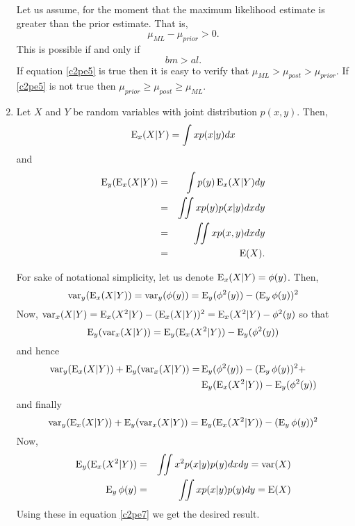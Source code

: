 \begin{enumerate}
Let us assume, for the moment that the maximum likelihood estimate is greater than the prior estimate.
That is,
\[
\mu_{ML} - \mu_{prior} > 0.
\]
This is possible if and only if 
\begin{equation}\label{c2pe5}
bm > al.
\end{equation}
If equation \eqref{c2pe5} is true then it is easy to verify that $\mu_{ML} > \mu_{post} > \mu_{prior}$. 
If \eqref{c2pe5} is not true then $\mu_{prior} \ge \mu_{post} \ge \mu_{ML}$.

\item Let $X$ and $Y$ be random variables with joint distribution $p(x, y)$. Then,
\[
\operatorname{E}_x(X|Y) = \int xp(x|y)dx
\]
and 
\begin{eqnarray*}
\operatorname{E}_y(\operatorname{E}_x(X|Y)) &=& \int p(y)\operatorname{E}_x(X|Y)dy \\
 &=& \iint xp(y)p(x|y)dxdy \\
 &=& \iint xp(x, y)dxdy \\
 &=& \operatorname{E}(X).
\end{eqnarray*}

For sake of notational simplicity, let us denote $\operatorname{E}_x(X|Y) = \phi(y)$. Then, 
\begin{equation}\label{c2pe6}
\operatorname{var}_y(\operatorname{E}_x(X|Y)) = \operatorname{var}_y(\phi(y)) = \operatorname{E}_y(\phi^2(y)) - (\operatorname{E}_y\phi(y))^2
\end{equation}
Now, $\operatorname{var}_x(X|Y) = \operatorname{E}_x(X^2|Y) - (\operatorname{E}_x(X|Y))^2 = \operatorname{E}_x(X^2|Y) - \phi^2(y)$ so that 
\[
\operatorname{E}_y(\operatorname{var}_x(X|Y)) = \operatorname{E}_y(\operatorname{E}_x(X^2|Y)) - \operatorname{E}_y(\phi^2(y))
\]
and hence
\[
\begin{split}
\operatorname{var}_y(\operatorname{E}_x(X|Y)) + \operatorname{E}_y(\operatorname{var}_x(X|Y)) =& \operatorname{E}_y(\phi^2(y)) - (\operatorname{E}_y\phi(y))^2 + \\
 & \operatorname{E}_y(\operatorname{E}_x(X^2|Y)) - \operatorname{E}_y(\phi^2(y)) 
\end{split}
\]
and finally
\begin{equation}\label{c2pe7}
\operatorname{var}_y(\operatorname{E}_x(X|Y)) + \operatorname{E}_y(\operatorname{var}_x(X|Y)) = \operatorname{E}_y(\operatorname{E}_x(X^2|Y)) - (\operatorname{E}_y\phi(y))^2 
\end{equation}
Now,
\begin{eqnarray*}
\operatorname{E}_y(\operatorname{E}_x(X^2|Y)) &=& \iint x^2 p(x|y)p(y)dxdy = \operatorname{var}(X) \\
\operatorname{E}_y\phi(y) &=& \iint xp(x|y)p(y)dy = \operatorname{E}(X)
\end{eqnarray*}
Using these in equation \eqref{c2pe7} we get the desired result.


\end{enumerate}
